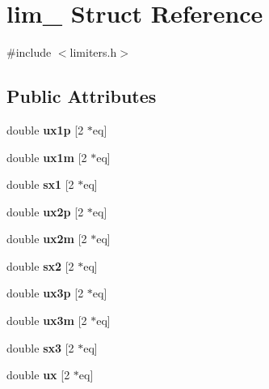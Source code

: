 \hypertarget{structlim__}{}\section{lim\+\_\+ Struct Reference}
\label{structlim__}


{\ttfamily \#include $<$limiters.\+h$>$}

\subsection*{Public Attributes}
\begin{DoxyCompactItemize}
\item 
\mbox{\label{structlim___afa62de35fc23bc4f5e235f5056f6b137}} 
double {\bfseries ux1p} \mbox{[}2 $\ast$eq\mbox{]}
\item 
\mbox{\label{structlim___afe15bfeca772fb7c91dbdc3f996ea737}} 
double {\bfseries ux1m} \mbox{[}2 $\ast$eq\mbox{]}
\item 
\mbox{\label{structlim___a60216547f49b2ae3eb47d8a88a78af05}} 
double {\bfseries sx1} \mbox{[}2 $\ast$eq\mbox{]}
\item 
\mbox{\label{structlim___a08d5b944a81be9c940fcecdf13fe7da6}} 
double {\bfseries ux2p} \mbox{[}2 $\ast$eq\mbox{]}
\item 
\mbox{\label{structlim___a9a8c9b4633bf4234cf279021a8c40a6b}} 
double {\bfseries ux2m} \mbox{[}2 $\ast$eq\mbox{]}
\item 
\mbox{\label{structlim___a9e263b76017e32cf3fe2a798797579ce}} 
double {\bfseries sx2} \mbox{[}2 $\ast$eq\mbox{]}
\item 
\mbox{\label{structlim___ab6e01cdb2d4927f1476acca60c7e8b4d}} 
double {\bfseries ux3p} \mbox{[}2 $\ast$eq\mbox{]}
\item 
\mbox{\label{structlim___a632c1d401202514aaf3eaebbb3603917}} 
double {\bfseries ux3m} \mbox{[}2 $\ast$eq\mbox{]}
\item 
\mbox{\label{structlim___ab9aae5cce5d935feac16ff1bdeace55d}} 
double {\bfseries sx3} \mbox{[}2 $\ast$eq\mbox{]}
\item 
\mbox{\label{structlim___aeb8502352b69ebc95465d0d9fe8a254a}} 
double {\bfseries ux} \mbox{[}2 $\ast$eq\mbox{]}
\end{DoxyCompactItemize}


